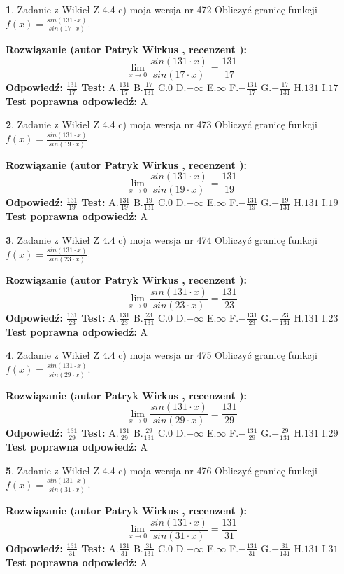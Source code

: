 \documentclass[12pt, a4paper]{article}
\theoremstyle{definition} %
\newtheorem{zad}{}
\newcommand{\zadStart}[1]{\begin{zad}#1\newline}
\newcommand{\zadStop}{\end{zad}}
\newcommand{\rozwStart}[2]{\noindent \textbf{Rozwiązanie (autor #1 , recenzent #2): }\newline}
\newcommand{\rozwStop}{\newline}
\newcommand{\odpStart}{\noindent \textbf{Odpowiedź:}\newline}
\newcommand{\odpStop}{\newline}
\newcommand{\testStart}{\noindent \textbf{Test:}\newline}
\newcommand{\testStop}{\newline}
\newcommand{\kluczStart}{\noindent \textbf{Test poprawna odpowiedź:}\newline}
\newcommand{\kluczStop}{\newline}
\begin{document}
\zadStart{Zadanie z Wikieł Z 4.4 c) moja wersja nr 472}
Obliczyć granicę funkcji $f(x)=\frac{sin(131\cdot x)}{sin(17\cdot x)}$.
\zadStop
\rozwStart{Patryk Wirkus}{}
$$\lim\limits_{x\to 0}\frac{sin(131\cdot x)}{sin(17\cdot x)}=
\frac{131}{17}$$
\rozwStop
\odpStart
$\frac{131}{17}$
\odpStop
\testStart
A.$\frac{131}{17}$
B.$\frac{17}{131}$
C.$0$
D.$-\infty$
E.$\infty$
F.$-\frac{131}{17}$
G.$-\frac{17}{131}$
H.$131$
I.$17$
\testStop
\kluczStart
A
\kluczStop



\zadStart{Zadanie z Wikieł Z 4.4 c) moja wersja nr 473}
Obliczyć granicę funkcji $f(x)=\frac{sin(131\cdot x)}{sin(19\cdot x)}$.
\zadStop
\rozwStart{Patryk Wirkus}{}
$$\lim\limits_{x\to 0}\frac{sin(131\cdot x)}{sin(19\cdot x)}=
\frac{131}{19}$$
\rozwStop
\odpStart
$\frac{131}{19}$
\odpStop
\testStart
A.$\frac{131}{19}$
B.$\frac{19}{131}$
C.$0$
D.$-\infty$
E.$\infty$
F.$-\frac{131}{19}$
G.$-\frac{19}{131}$
H.$131$
I.$19$
\testStop
\kluczStart
A
\kluczStop



\zadStart{Zadanie z Wikieł Z 4.4 c) moja wersja nr 474}
Obliczyć granicę funkcji $f(x)=\frac{sin(131\cdot x)}{sin(23\cdot x)}$.
\zadStop
\rozwStart{Patryk Wirkus}{}
$$\lim\limits_{x\to 0}\frac{sin(131\cdot x)}{sin(23\cdot x)}=
\frac{131}{23}$$
\rozwStop
\odpStart
$\frac{131}{23}$
\odpStop
\testStart
A.$\frac{131}{23}$
B.$\frac{23}{131}$
C.$0$
D.$-\infty$
E.$\infty$
F.$-\frac{131}{23}$
G.$-\frac{23}{131}$
H.$131$
I.$23$
\testStop
\kluczStart
A
\kluczStop



\zadStart{Zadanie z Wikieł Z 4.4 c) moja wersja nr 475}
Obliczyć granicę funkcji $f(x)=\frac{sin(131\cdot x)}{sin(29\cdot x)}$.
\zadStop
\rozwStart{Patryk Wirkus}{}
$$\lim\limits_{x\to 0}\frac{sin(131\cdot x)}{sin(29\cdot x)}=
\frac{131}{29}$$
\rozwStop
\odpStart
$\frac{131}{29}$
\odpStop
\testStart
A.$\frac{131}{29}$
B.$\frac{29}{131}$
C.$0$
D.$-\infty$
E.$\infty$
F.$-\frac{131}{29}$
G.$-\frac{29}{131}$
H.$131$
I.$29$
\testStop
\kluczStart
A
\kluczStop



\zadStart{Zadanie z Wikieł Z 4.4 c) moja wersja nr 476}
Obliczyć granicę funkcji $f(x)=\frac{sin(131\cdot x)}{sin(31\cdot x)}$.
\zadStop
\rozwStart{Patryk Wirkus}{}
$$\lim\limits_{x\to 0}\frac{sin(131\cdot x)}{sin(31\cdot x)}=
\frac{131}{31}$$
\rozwStop
\odpStart
$\frac{131}{31}$
\odpStop
\testStart
A.$\frac{131}{31}$
B.$\frac{31}{131}$
C.$0$
D.$-\infty$
E.$\infty$
F.$-\frac{131}{31}$
G.$-\frac{31}{131}$
H.$131$
I.$31$
\testStop
\kluczStart
A
\kluczStop
\end{document}

